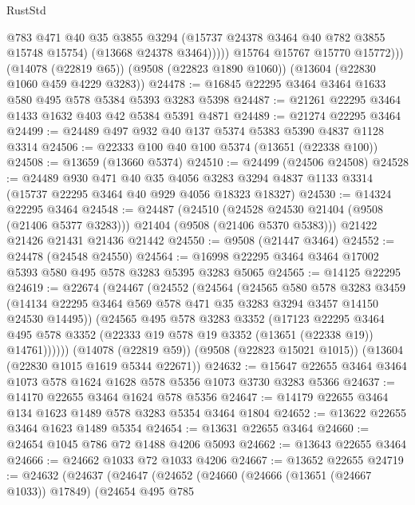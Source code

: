 \begin{lexlean}{RustStd}
\begin{coremodule}
                  @783
                  @471
                  @40
                  @35
                  @3855
                  @3294
                  (@15737 @24378 @3464 @40 @782 @3855 @15748 @15754)
                  (@13668 @24378 @3464)))))
          @15764
          @15767
          @15770
          @15772)))
    (@14078 (@22819 @65))
    (@9508 (@22823 @1890 @1060))
    (@13604 (@22830 @1060 @459 @4229 @3283))
@24478 := @16845 @22295 @3464 @3464 @1633 @580 @495 @578 @5384 @5393 @3283 @5398
@24487 := @21261 @22295 @3464 @1433 @1632 @403 @42 @5384 @5391 @4871
@24489 := @21274 @22295 @3464
@24499 := @24489 @497 @932 @40 @137 @5374 @5383 @5390 @4837 @1128 @3314
@24506 := @22333 @100 @40 @100 @5374 (@13651 (@22338 @100))
@24508 := @13659 (@13660 @5374)
@24510 := @24499 (@24506 @24508)
@24528 := @24489
    @930
    @471
    @40
    @35
    @4056
    @3283
    @3294
    @4837
    @1133
    @3314
    (@15737 @22295 @3464 @40 @929 @4056 @18323 @18327)
@24530 := @14324 @22295 @3464
@24548 := @24487
    (@24510 (@24528 @24530 @21404 (@9508 (@21406 @5377 @3283))) @21404 (@9508 (@21406 @5370 @5383)))
    @21422
    @21426
    @21431
    @21436
    @21442
@24550 := @9508 (@21447 @3464)
@24552 := @24478 (@24548 @24550)
@24564 := @16998 @22295 @3464 @3464 @17002 @5393 @580 @495 @578 @3283 @5395 @3283 @5065
@24565 := @14125 @22295
@24619 := @22674
    (@24467
      (@24552
        (@24564
          (@24565
            @580
            @578
            @3283
            @3459
            (@14134 @22295 @3464 @569 @578 @471 @35 @3283 @3294 @3457 @14150 @24530 @14495))
          (@24565
            @495
            @578
            @3283
            @3352
            (@17123
              @22295
              @3464
              @495
              @578
              @3352
              (@22333 @19 @578 @19 @3352 (@13651 (@22338 @19)) @14761))))))
    (@14078 (@22819 @59))
    (@9508 (@22823 @15021 @1015))
    (@13604 (@22830 @1015 @1619 @5344 @22671))
@24632 := @15647 @22655 @3464 @3464 @1073 @578 @1624 @1628 @578 @5356 @1073 @3730 @3283 @5366
@24637 := @14170 @22655 @3464 @1624 @578 @5356
@24647 := @14179 @22655 @3464 @134 @1623 @1489 @578 @3283 @5354 @3464 @1804
@24652 := @13622 @22655 @3464 @1623 @1489 @5354
@24654 := @13631 @22655 @3464
@24660 := @24654 @1045 @786 @72 @1488 @4206 @5093
@24662 := @13643 @22655 @3464
@24666 := @24662 @1033 @72 @1033 @4206
@24667 := @13652 @22655
@24719 := @24632
    (@24637
      (@24647
        (@24652
          (@24660
            (@24666 (@13651 (@24667 @1033)) @17849)
            (@24654
              @495
              @785

\end{coremodule}
\end{lexlean}
